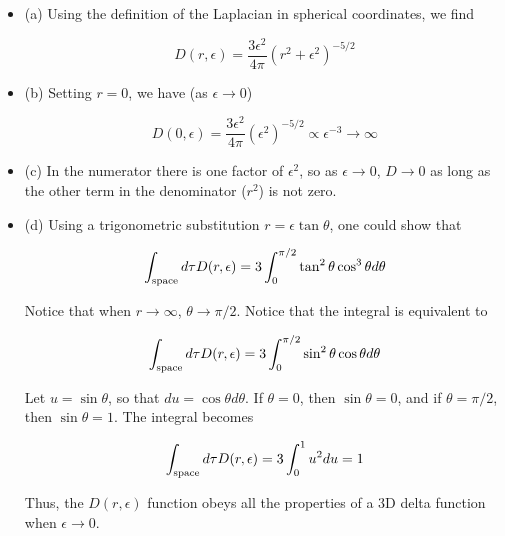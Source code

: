 \documentclass[10pt]{article}
\begin{document}
\begin{itemize}
\item (a) Using the definition of the Laplacian in spherical coordinates, we find

\begin{equation}
D(r,\epsilon) = \frac{3\epsilon^2}{4\pi} (r^2+\epsilon^2)^{-5/2}
\end{equation}

\item (b) Setting $r = 0$, we have (as $\epsilon \to 0$)

\begin{equation}
D(0,\epsilon) = \frac{3\epsilon^2}{4\pi} (\epsilon^2)^{-5/2} \propto \epsilon^{-3} \to \infty
\end{equation}

\item (c) In the numerator there is one factor of $\epsilon^2$, so as $\epsilon \to 0$, $D \to 0$ as long as the other term in the denominator ($r^2$) is not zero.

\item (d) Using a trigonometric substitution $r = \epsilon \tan\theta$, one could show that

\begin{equation}
\int_{\rm space} d\tau D(r,\epsilon) = 3 \int_{0}^{\pi/2} \tan^2\theta \cos^3\theta d\theta
\end{equation}

Notice that when $r \to \infty$, $\theta \to \pi/2$. Notice that the integral is equivalent to

\begin{equation}
\int_{\rm space} d\tau D(r,\epsilon) = 3 \int_{0}^{\pi/2} \sin^2\theta \cos\theta d\theta
\end{equation}

Let $u = \sin\theta$, so that $du = \cos\theta d\theta$.  If $\theta = 0$, then $\sin\theta = 0$, and if $\theta = \pi/2$, then $\sin\theta = 1$. The integral becomes

\begin{equation}
\int_{\rm space} d\tau D(r,\epsilon) = 3 \int_{0}^{1} u^2 du = 1
\end{equation}

Thus, the $D(r,\epsilon)$ function obeys all the properties of a 3D delta function when $\epsilon \to 0$.

\end{itemize}
\end{document}
